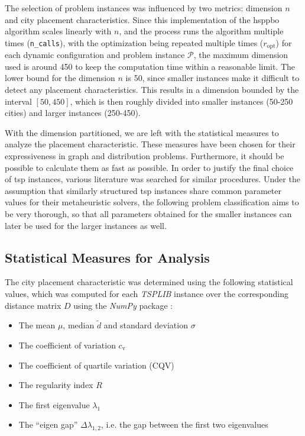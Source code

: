 The selection of problem instances was influenced by two metrics: dimension $n$ and city placement characteristics. Since this implementation of the \gls{hsppbo} algorithm scales linearly with $n$, and the  process runs the algorithm multiple times (\texttt{n\_calls}), with the optimization being repeated multiple times ($r_\text{opt}$) for each dynamic configuration and problem instance $\mathcal{P}$, the maximum dimension used is around 450 to keep the computation time within a reasonable limit. The lower bound for the dimension $n$ is 50, since smaller instances make it difficult to detect any placement characteristics. This results in a dimension bounded by the interval $[50,450]$, which is then roughly divided into smaller instances (50-250 cities) and larger instances (250-450).

With the dimension partitioned, we are left with the statistical measures to analyze the placement characteristic. These measures have been chosen for their expressiveness in graph and distribution problems. Furthermore, it should be possible to calculate them as fast as possible. In order to justify the final choice of \gls{tsp} instances, various literature was searched for similar procedures.
Under the assumption that similarly structured \gls{tsp} instances share common parameter values for their metaheuristic solvers, the following problem classification aims to be very thorough, so that all parameters obtained for the smaller instances can later be used for the larger instances as well.

\subsection{Statistical Measures for Analysis}

The city placement characteristic was determined using the following statistical values, which was computed for each \textit{TSPLIB} instance over the corresponding distance matrix $D$ using the \textit{NumPy} package \cite{harris2020array}:

\begin{itemize}
	\item The mean $\mu$, median $\tilde{d}$ and standard deviation $\sigma$
	\item The coefficient of variation $c_\text{v}$
	\item The coefficient of quartile variation (CQV)
	\item The regularity index $R$
	\item The first eigenvalue $\lambda_1$
	\item The \enquote{eigen gap} $\Delta\lambda_{1,2}$, i.e. the gap between the first two eigenvalues
\end{itemize}

